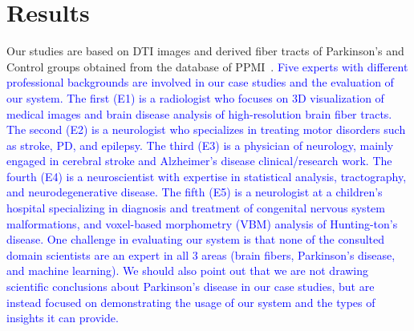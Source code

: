 
\section{Results}
\label{sec:cases}

\noindent %
Our studies are based on DTI images and %
derived fiber tracts of Parkinson's and Control groups obtained from the 
database of PPMI~\cite{marek2011parkinson}. \textcolor{blue}{Five experts with different professional backgrounds are involved in our case studies and the evaluation of our system. The first (E1) is a radiologist who focuses on 3D visualization of medical images and brain disease analysis of high-resolution brain fiber tracts. The second (E2) is a neurologist who specializes in treating motor disorders such as stroke, PD, and epilepsy. The third (E3) is a physician of neurology, mainly engaged in cerebral stroke and Alzheimer's disease clinical/research work. The fourth (E4) is a neuroscientist with expertise in statistical analysis, tractography, and neurodegenerative disease. The fifth (E5) is a neurologist at a children’s hospital specializing in diagnosis and treatment of congenital nervous system malformations, and voxel-based morphometry (VBM) analysis of Hunting-ton’s disease. One challenge in evaluating our system is that none of the consulted domain scientists are an expert in all 3 areas (brain fibers, Parkinson's disease, and machine learning). We should also point out that we are not drawing scientific conclusions about Parkinson's disease in our case studies, but are instead focused on demonstrating the usage of our system and the types of insights it can provide.}




